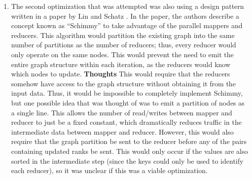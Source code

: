\begin{enumerate}
\item The second optimization that was attempted was also using a design pattern
written in a paper by Lin and Schatz \cite{lin2010design}. In the paper, the authors
describe a concept known as ``Schimmy'' to take advantage of the parallel mappers and reducers. 
This algorithm would partition the existing graph into the same number of partitions 
as the number of reducers; thus, every reducer would only operate on the same nodes. 
This would prevent the need to emit the entire graph structure within each iteration,
as the reducers would know which nodes to update.
    \subitem \textbf{Thoughts} This would require that the reducers somehow have
    access to the graph structure without obtaining it from the input data. Thus, 
    it would be impossible to completely implement Schimmy, but one possible idea 
    that was thought of was to emit a partition of nodes as a single line. This 
    allows the number of read/writes between mapper and reducer to just be a fixed
    constant, which dramatically reduces traffic in the intermediate data between
    mapper and reducer. However, this would also require that the graph
    partition be sent to the reducer before any of the pairs containing updated ranks
    be sent. This would only occur if the values are also sorted in the intermediate step
    (since the keys could only be used to identify each reducer), so it
    was unclear if this was a viable optimization.
\end{enumerate}

\printbibliography





